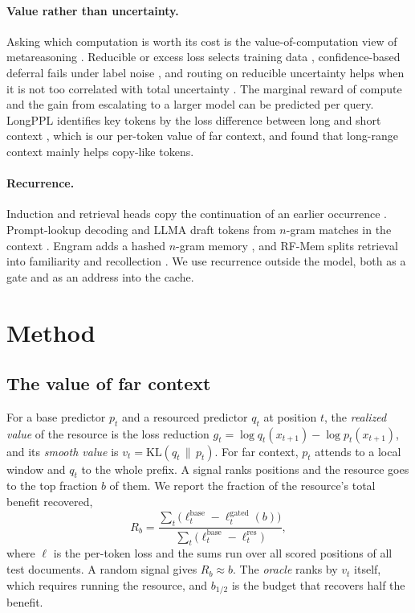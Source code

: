 \documentclass[11pt]{article}
\newcommand{\Rb}[1]{R_{#1}}
\newcommand{\bhalf}{b_{1/2}}
\newcommand{\KL}{\mathrm{KL}}
\begin{document}
\paragraph{Value rather than uncertainty.} Asking which computation is worth its cost is the value-of-computation view of metareasoning \citep{russell1991right,lieder2020resource}. Reducible or excess loss selects training data \citep{mindermann2022rholoss,lin2024rho1}, confidence-based deferral fails under label noise \citep{jitkrittum2023cascade}, and routing on reducible uncertainty helps when it is not too correlated with total uncertainty \citep{peale2026routing}. The marginal reward of compute \citep{damani2025hardthink} and the gain from escalating to a larger model \citep{wang2026srr} can be predicted per query. LongPPL identifies key tokens by the loss difference between long and short context \citep{fang2024longppl}, which is our per-token value of far context, and \citet{sun2021longrange} found that long-range context mainly helps copy-like tokens.

\paragraph{Recurrence.} Induction and retrieval heads copy the continuation of an earlier occurrence \citep{olsson2022induction,wu2024retrievalhead}. Prompt-lookup decoding and LLMA draft tokens from $n$-gram matches in the context \citep{saxena2023pld,yang2023llma}. Engram adds a hashed $n$-gram memory \citep{cheng2026engram,zhou2026tngram}, and RF-Mem splits retrieval into familiarity and recollection \citep{zhang2026rfmem}. We use recurrence outside the model, both as a gate and as an address into the cache.

\section{Method}\label{sec:method}

\subsection{The value of far context}
For a base predictor $p_t$ and a resourced predictor $q_t$ at position $t$, the \emph{realized value} of the resource is the loss reduction $g_t=\log q_t(x_{t+1})-\log p_t(x_{t+1})$, and its \emph{smooth value} is $v_t=\KL(q_t\,\|\,p_t)$. For far context, $p_t$ attends to a local window and $q_t$ to the whole prefix. A signal ranks positions and the resource goes to the top fraction $b$ of them. We report the fraction of the resource's total benefit recovered,
\[
\Rb{b}=\frac{\sum_t\big(\ell^{\text{base}}_t-\ell^{\text{gated}}_t(b)\big)}{\sum_t\big(\ell^{\text{base}}_t-\ell^{\text{res}}_t\big)},
\]
where $\ell$ is the per-token loss and the sums run over all scored positions of all test documents. A random signal gives $\Rb{b}\approx b$. The \emph{oracle} ranks by $v_t$ itself, which requires running the resource, and $\bhalf$ is the budget that recovers half the benefit.
\end{document}
